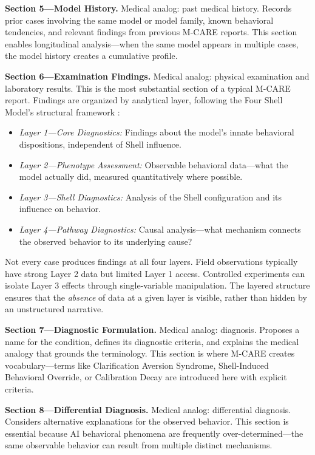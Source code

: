 \documentclass[11pt]{article}
\begin{document}
\textbf{Section 5---Model History.} Medical analog: past medical history. Records prior cases involving the same model or model family, known behavioral tendencies, and relevant findings from previous M-CARE reports. This section enables longitudinal analysis---when the same model appears in multiple cases, the model history creates a cumulative profile.

\textbf{Section 6---Examination Findings.} Medical analog: physical examination and laboratory results. This is the most substantial section of a typical M-CARE report. Findings are organized by analytical layer, following the Four Shell Model's structural framework \citep{Jeong2026}:

\begin{itemize}[nosep]
  \item \textit{Layer 1---Core Diagnostics:} Findings about the model's innate behavioral dispositions, independent of Shell influence.
  \item \textit{Layer 2---Phenotype Assessment:} Observable behavioral data---what the model actually did, measured quantitatively where possible.
  \item \textit{Layer 3---Shell Diagnostics:} Analysis of the Shell configuration and its influence on behavior.
  \item \textit{Layer 4---Pathway Diagnostics:} Causal analysis---what mechanism connects the observed behavior to its underlying cause?
\end{itemize}

Not every case produces findings at all four layers. Field observations typically have strong Layer 2 data but limited Layer 1 access. Controlled experiments can isolate Layer 3 effects through single-variable manipulation. The layered structure ensures that the \textit{absence} of data at a given layer is visible, rather than hidden by an unstructured narrative.

\textbf{Section 7---Diagnostic Formulation.} Medical analog: diagnosis. Proposes a name for the condition, defines its diagnostic criteria, and explains the medical analogy that grounds the terminology. This section is where M-CARE creates vocabulary---terms like Clarification Aversion Syndrome, Shell-Induced Behavioral Override, or Calibration Decay are introduced here with explicit criteria.

\textbf{Section 8---Differential Diagnosis.} Medical analog: differential diagnosis. Considers alternative explanations for the observed behavior. This section is essential because AI behavioral phenomena are frequently over-determined---the same observable behavior can result from multiple distinct mechanisms.
\end{document}
